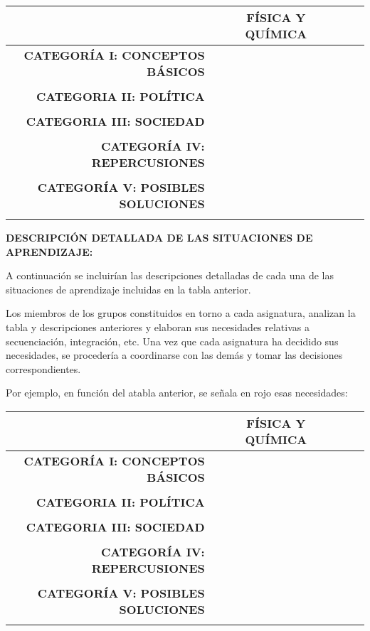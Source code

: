 \documentclass[
]{article}
\begin{document}
\begin{longtable}[]{@{}rccccc@{}}
\toprule
& & \textbf{FÍSICA Y QUÍMICA} & & & \\
\midrule
\endhead
\textbf{CATEGORÍA I: CONCEPTOS BÁSICOS} & & & & & \\
& & & & & \\
\textbf{CATEGORIA II: POLÍTICA} & & & & & \\
& & & & & \\
\textbf{CATEGORIA III: SOCIEDAD} & & & & & \\
& & & & & \\
\textbf{CATEGORÍA IV: REPERCUSIONES} & & & & & \\
& & & & & \\
\textbf{CATEGORÍA V: POSIBLES SOLUCIONES} & & & & & \\
& & & & & \\
\bottomrule
\end{longtable}

\textbf{DESCRIPCIÓN DETALLADA DE LAS SITUACIONES DE APRENDIZAJE:}

A continuación se incluirían las descripciones detalladas de cada una de
las situaciones de aprendizaje incluidas en la tabla anterior.

Los miembros de los grupos constituidos en torno a cada asignatura,
analizan la tabla y descripciones anteriores y elaboran sus necesidades
relativas a secuenciación, integración, etc. Una vez que cada asignatura
ha decidido sus necesidades, se procedería a coordinarse con las demás y
tomar las decisiones correspondientes.

Por ejemplo, en función del atabla anterior, se señala en rojo esas
necesidades:

\begin{longtable}[]{@{}rccccc@{}}
\toprule
& & \textbf{FÍSICA Y QUÍMICA} & & & \\
\midrule
\endhead
\textbf{CATEGORÍA I: CONCEPTOS BÁSICOS} & & & & & \\
& & & & & \\
\textbf{CATEGORIA II: POLÍTICA} & & & & & \\
& & & & & \\
\textbf{CATEGORIA III: SOCIEDAD} & & & & & \\
& & & & & \\
\textbf{CATEGORÍA IV: REPERCUSIONES} & & & & & \\
& & & & & \\
\textbf{CATEGORÍA V: POSIBLES SOLUCIONES} & & & & & \\
& & & & & \\
\bottomrule
\end{longtable}

\begin{longtable}[]{@{}l@{}}
\toprule
\endhead
\bottomrule
\end{longtable}
\end{document}
